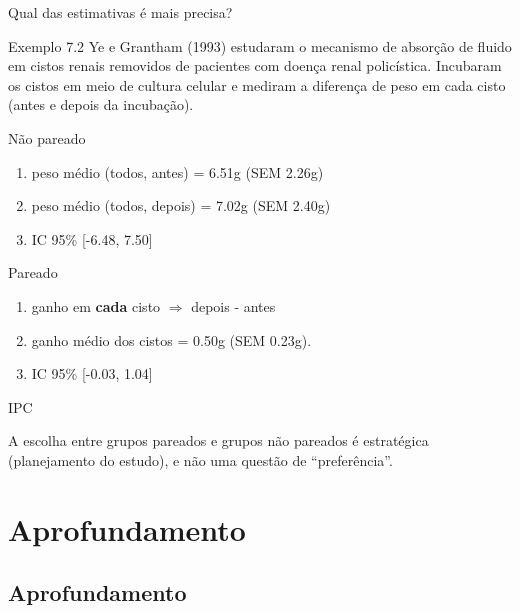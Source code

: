 \documentclass{beamer}
\begin{document}
\begin{frame}{\scriptsize Qual das estimativas é mais precisa?}
  \begin{exampleblock}{Exemplo 7.2}
    \scriptsize
    Ye e Grantham (1993) estudaram o mecanismo de absorção de fluido em cistos renais removidos de pacientes com doença renal policística.
    Incubaram os cistos em meio de cultura celular e mediram a diferença de peso em cada cisto (antes e depois da incubação).

    \scriptsize
    \begin{exampleblock}{Não pareado}
      \footnotesize
      \begin{enumerate}
        \footnotesize
      \item<2,4> peso médio (todos, antes) = 6.51g (SEM 2.26g)
      \item<2,4> peso médio (todos, depois) = 7.02g (SEM 2.40g)
      \item<2,4> IC 95\% [-6.48, 7.50]
      \end{enumerate}
    \end{exampleblock}
    \begin{exampleblock}{Pareado}
      \footnotesize
      \begin{enumerate}
        \footnotesize
      \item<3,4> ganho em {\bf cada} cisto $\Rightarrow$ depois - antes
      \item<3,4> ganho médio dos cistos = 0.50g (SEM 0.23g).
      \item<3,4> IC 95\% [-0.03, 1.04]
      \end{enumerate}
    \end{exampleblock}
  \end{exampleblock}
\end{frame}

\begin{frame}{\scriptsize IPC}
  \begin{block}{}
    A escolha entre grupos pareados e grupos não pareados é estratégica (planejamento do estudo), e não uma questão de ``preferência''.
  \end{block}
\end{frame}
\section{Aprofundamento}

\subsection{Aprofundamento}
\end{document}
